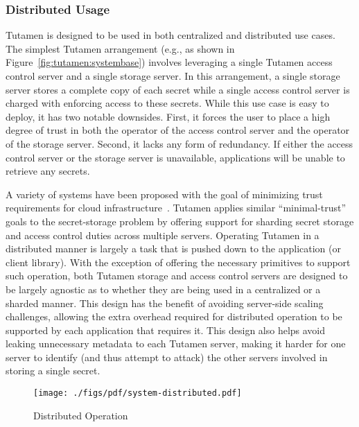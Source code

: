 \subsubsection{Distributed Usage}
\label{sec:tutamen:arch:distributed}

Tutamen is designed to be used in both centralized and distributed use
cases. The simplest Tutamen arrangement (e.g., as shown in
Figure~\ref{fig:tutamen:systembase}) involves leveraging a single
Tutamen access control server and a single storage server. In this
arrangement, a single storage server stores a complete copy of each
secret while a single access control server is charged with enforcing
access to these secrets. While this use case is easy to deploy, it has
two notable downsides. First, it forces the user to place a high
degree of trust in both the operator of the access control server and
the operator of the storage server. Second, it lacks any form of
redundancy. If either the access control server or the storage server
is unavailable, applications will be unable to retrieve any secrets.

A variety of systems have been proposed with the goal of minimizing
trust requirements for cloud infrastructure~\cite{bessani2011,
  kallahalla2003, kubiatowicz2000, mahajan2011,
  wilcox-o'hearn2008}. Tutamen applies similar ``minimal-trust'' goals
to the secret-storage problem by offering support for sharding secret
storage and access control duties across multiple servers. Operating
Tutamen in a distributed manner is largely a task that is pushed down
to the application (or client library). With the exception of offering
the necessary primitives to support such operation, both Tutamen
storage and access control servers are designed to be largely agnostic
as to whether they are being used in a centralized or a sharded
manner. This design has the benefit of avoiding server-side scaling
challenges, allowing the extra overhead required for distributed
operation to be supported by each application that requires it. This
design also helps avoid leaking unnecessary metadata to each Tutamen
server, making it harder for one server to identify (and thus attempt
to attack) the other servers involved in storing a single secret.

\begin{figure}[th]
  \centering
  \texttt{[image: ./figs/pdf/system-distributed.pdf]}
  \caption{Distributed Operation}
  \label{fig:tutamen:systemdistributed}
\end{figure}

